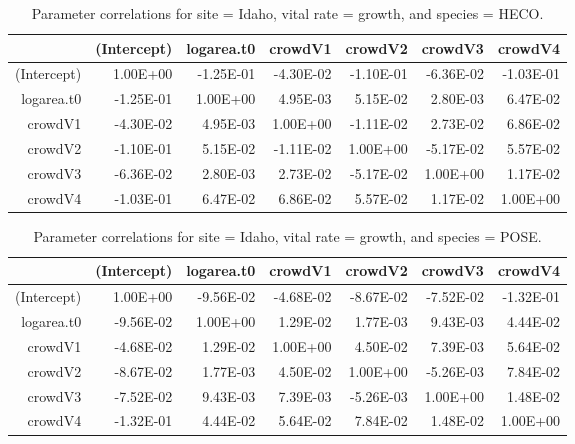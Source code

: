 \documentclass[12pt,]{article}
\begin{document}
\begin{table}[ht]
\centering
\caption{Parameter correlations for site = Idaho, vital rate = growth, and species = HECO.} 
\begin{tabular}{rrrrrrr}
  \hline
 & (Intercept) & logarea.t0 & crowdV1 & crowdV2 & crowdV3 & crowdV4 \\ 
  \hline
(Intercept) & 1.00E+00 & -1.25E-01 & -4.30E-02 & -1.10E-01 & -6.36E-02 & -1.03E-01 \\ 
  logarea.t0 & -1.25E-01 & 1.00E+00 & 4.95E-03 & 5.15E-02 & 2.80E-03 & 6.47E-02 \\ 
  crowdV1 & -4.30E-02 & 4.95E-03 & 1.00E+00 & -1.11E-02 & 2.73E-02 & 6.86E-02 \\ 
  crowdV2 & -1.10E-01 & 5.15E-02 & -1.11E-02 & 1.00E+00 & -5.17E-02 & 5.57E-02 \\ 
  crowdV3 & -6.36E-02 & 2.80E-03 & 2.73E-02 & -5.17E-02 & 1.00E+00 & 1.17E-02 \\ 
  crowdV4 & -1.03E-01 & 6.47E-02 & 6.86E-02 & 5.57E-02 & 1.17E-02 & 1.00E+00 \\ 
   \hline
\end{tabular}
\end{table}

\begin{table}[ht]
\centering
\caption{Parameter correlations for site = Idaho, vital rate = growth, and species = POSE.} 
\begin{tabular}{rrrrrrr}
  \hline
 & (Intercept) & logarea.t0 & crowdV1 & crowdV2 & crowdV3 & crowdV4 \\ 
  \hline
(Intercept) & 1.00E+00 & -9.56E-02 & -4.68E-02 & -8.67E-02 & -7.52E-02 & -1.32E-01 \\ 
  logarea.t0 & -9.56E-02 & 1.00E+00 & 1.29E-02 & 1.77E-03 & 9.43E-03 & 4.44E-02 \\ 
  crowdV1 & -4.68E-02 & 1.29E-02 & 1.00E+00 & 4.50E-02 & 7.39E-03 & 5.64E-02 \\ 
  crowdV2 & -8.67E-02 & 1.77E-03 & 4.50E-02 & 1.00E+00 & -5.26E-03 & 7.84E-02 \\ 
  crowdV3 & -7.52E-02 & 9.43E-03 & 7.39E-03 & -5.26E-03 & 1.00E+00 & 1.48E-02 \\ 
  crowdV4 & -1.32E-01 & 4.44E-02 & 5.64E-02 & 7.84E-02 & 1.48E-02 & 1.00E+00 \\ 
   \hline
\end{tabular}
\end{table}
\end{document}
